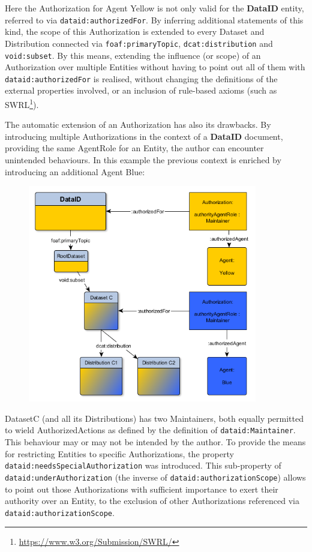 \documentclass[a4paper,english,twoside,BCOR1.5cm,headsepline,DIV12,appendixprefix,final,12pt]{scrbook}
\newcommand{\dataid}{{\ttfamily\bfseries DataID}\xspace}
\newcommand{\prop}[1]{{{\texttt{#1}}}}
\newcommand\footnoteurl[1]{\footnote{\scriptsize\url{#1}}}
\begin{document}
Here the Authorization for Agent Yellow is not only valid for the \dataid entity, referred to via \prop{dataid:authorizedFor}. By inferring additional statements of this kind, the scope of this Authorization is extended to every Dataset and Distribution connected via \prop{foaf:primaryTopic}, \prop{dcat:distribution} and \prop{void:subset}. By this means, extending the influence (or scope) of an Authorization over multiple Entities without having to point out all of them with \prop{dataid:authorizedFor} is realised, without changing the definitions of the external properties involved, or an inclusion of rule-based axioms (such as SWRL\footnoteurl{https://www.w3.org/Submission/SWRL/}).

The automatic extension of an Authorization has also its drawbacks. By introducing multiple Authorizations in the context of a \dataid document, providing the same AgentRole for an Entity, the author can encounter unintended behaviours. In this example the previous context is enriched by introducing an additional Agent Blue:

\begin{figure}[!htbp]
\centering
  \includegraphics[width=10cm]{images/AuthorizationExample2.png}
  \label{fig:dlaxioms}
\end{figure}

DatasetC (and all its Distributions) has two Maintainers, both equally permitted to wield AuthorizedActions as defined by the definition of \prop{dataid:Maintainer}. This behaviour may or may not be intended by the author. To provide the means for restricting Entities to specific Authorizations, the property \prop{dataid:needsSpecialAuthorization} was introduced. This sub-property of \prop{dataid:underAuthorization} (the inverse of \prop{dataid:authorizationScope}) allows to point out those Authorizations with sufficient importance to exert their authority over an Entity, to the exclusion of other Authorizations referenced via \prop{dataid:authorizationScope}.
\end{document}
